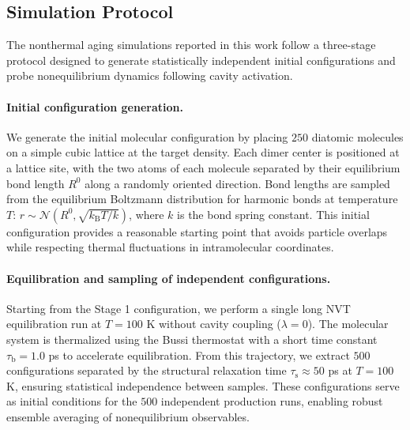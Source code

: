 \documentclass[%
 reprint,
 amsmath,amssymb,
 aps,
]{revtex4-2}
\begin{document}
\subsection{Simulation Protocol}

The nonthermal aging simulations reported in this work follow a three-stage protocol designed to generate statistically independent initial configurations and probe nonequilibrium dynamics following cavity activation.

\paragraph*{Initial configuration generation.}
We generate the initial molecular configuration by placing $250$ diatomic molecules on a simple cubic lattice at the target density.
Each dimer center is positioned at a lattice site, with the two atoms of each molecule separated by their equilibrium bond length $R^0$ along a randomly oriented direction.
Bond lengths are sampled from the equilibrium Boltzmann distribution for harmonic bonds at temperature $T$: $r \sim \mathcal{N}(R^0, \sqrt{k_\mathrm{B}T/k})$, where $k$ is the bond spring constant.
This initial configuration provides a reasonable starting point that avoids particle overlaps while respecting thermal fluctuations in intramolecular coordinates.

\paragraph*{Equilibration and sampling of independent configurations.}
Starting from the Stage 1 configuration, we perform a single long NVT equilibration run at $T = 100$ K without cavity coupling ($\lambda = 0$).
The molecular system is thermalized using the Bussi thermostat with a short time constant $\tau_\mathrm{b} = 1.0$ ps to accelerate equilibration.
From this trajectory, we extract $500$ configurations separated by the structural relaxation time $\tau_\mathrm{s} \approx 50$ ps at $T = 100$ K, ensuring statistical independence between samples.
These configurations serve as initial conditions for the $500$ independent production runs, enabling robust ensemble averaging of nonequilibrium observables.
\end{document}
